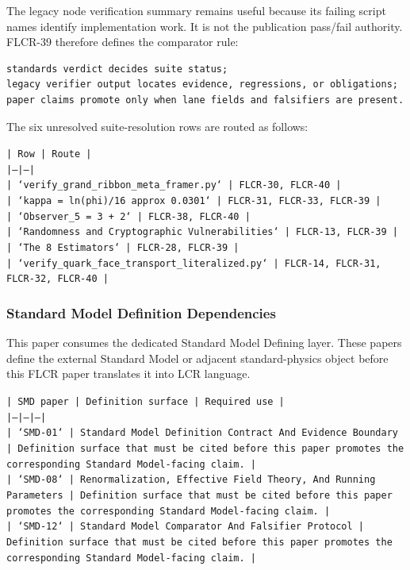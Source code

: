 \documentclass[11pt]{article}
\begin{document}
The legacy node verification summary remains useful because its failing
script names identify implementation work. It is not the publication pass/fail
authority. FLCR-39 therefore defines the comparator rule:

\begin{verbatim}
standards verdict decides suite status;
legacy verifier output locates evidence, regressions, or obligations;
paper claims promote only when lane fields and falsifiers are present.
\end{verbatim}

The six unresolved suite-resolution rows are routed as follows:

\noindent\texttt{| Row | Route |}\\
\noindent\texttt{|---|---|}\\
\noindent\texttt{| `verify\_grand\_ribbon\_meta\_framer.py` | FLCR-30, FLCR-40 |}\\
\noindent\texttt{| `kappa = ln(phi)/16 approx 0.0301` | FLCR-31, FLCR-33, FLCR-39 |}\\
\noindent\texttt{| `Observer\_5 = 3 + 2` | FLCR-38, FLCR-40 |}\\
\noindent\texttt{| `Randomness and Cryptographic Vulnerabilities` | FLCR-13, FLCR-39 |}\\
\noindent\texttt{| `The 8 Estimators` | FLCR-28, FLCR-39 |}\\
\noindent\texttt{| `verify\_quark\_face\_transport\_literalized.py` | FLCR-14, FLCR-31, FLCR-32, FLCR-40 |}\\

\subsubsection*{Standard Model Definition Dependencies}

This paper consumes the dedicated Standard Model Defining layer. These papers define the external Standard Model or adjacent standard-physics object before this FLCR paper translates it into LCR language.

\noindent\texttt{| SMD paper | Definition surface | Required use |}\\
\noindent\texttt{|---|---|---|}\\
\noindent\texttt{| `SMD-01` | Standard Model Definition Contract And Evidence Boundary | Definition surface that must be cited before this paper promotes the corresponding Standard Model-facing claim. |}\\
\noindent\texttt{| `SMD-08` | Renormalization, Effective Field Theory, And Running Parameters | Definition surface that must be cited before this paper promotes the corresponding Standard Model-facing claim. |}\\
\noindent\texttt{| `SMD-12` | Standard Model Comparator And Falsifier Protocol | Definition surface that must be cited before this paper promotes the corresponding Standard Model-facing claim. |}\\
\end{document}
